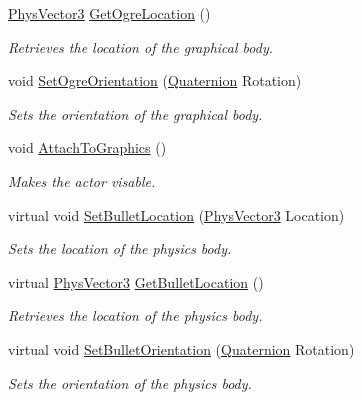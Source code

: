 \begin{DoxyCompactItemize}
\hyperlink{classPhysVector3}{PhysVector3} \hyperlink{classphys_1_1ActorBase_a52a65d23c76c805f4851191b62712ed8}{GetOgreLocation} ()
\begin{DoxyCompactList}\small\item\em Retrieves the location of the graphical body. \item\end{DoxyCompactList}\item 
void \hyperlink{classphys_1_1ActorBase_a7b2d13cb1e8bba60eeae782a53fd5e49}{SetOgreOrientation} (\hyperlink{classphys_1_1Quaternion}{Quaternion} Rotation)
\begin{DoxyCompactList}\small\item\em Sets the orientation of the graphical body. \item\end{DoxyCompactList}\item 
void \hyperlink{classphys_1_1ActorBase_a45f190cb9b647bb3385d1298f9dab589}{AttachToGraphics} ()
\begin{DoxyCompactList}\small\item\em Makes the actor visable. \item\end{DoxyCompactList}\item 
virtual void \hyperlink{classphys_1_1ActorBase_ab8d8c68937ea92b245b411c07b8bde7a}{SetBulletLocation} (\hyperlink{classPhysVector3}{PhysVector3} Location)
\begin{DoxyCompactList}\small\item\em Sets the location of the physics body. \item\end{DoxyCompactList}\item 
virtual \hyperlink{classPhysVector3}{PhysVector3} \hyperlink{classphys_1_1ActorBase_ac7c8bbb4859668d71325a791c88584ae}{GetBulletLocation} ()
\begin{DoxyCompactList}\small\item\em Retrieves the location of the physics body. \item\end{DoxyCompactList}\item 
virtual void \hyperlink{classphys_1_1ActorBase_a492244ac46ced53b809f436da992bc84}{SetBulletOrientation} (\hyperlink{classphys_1_1Quaternion}{Quaternion} Rotation)
\begin{DoxyCompactList}\small\item\em Sets the orientation of the physics body. \item\end{DoxyCompactList}\end{DoxyCompactItemize}
